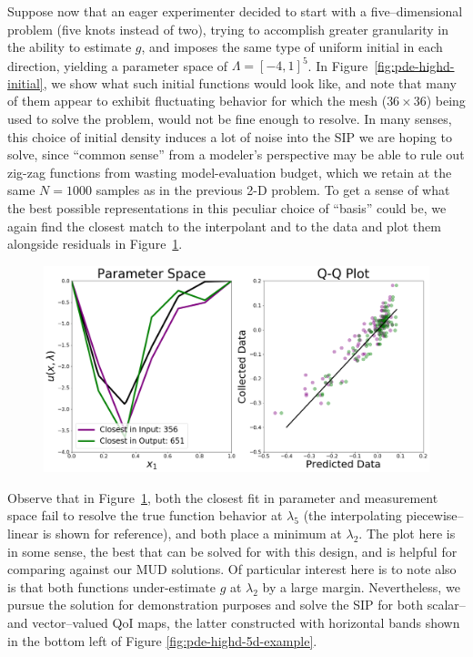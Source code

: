 Suppose now that an eager experimenter decided to start with a five--dimensional problem (five knots instead of two), trying to accomplish greater granularity in the ability to estimate $g$, and imposes the same type of uniform initial in each direction, yielding a parameter space of $\Lambda = [-4, 1]^5$.
In Figure~\ref{fig:pde-highd-initial}, we show what such initial functions would look like, and note that many of them appear to exhibit fluctuating behavior for which the mesh ($36\times36$) being used to solve the problem, would not be fine enough to resolve.
In many senses, this choice of initial density induces a lot of noise into the SIP we are hoping to solve, since ``common sense'' from a modeler's perspective may be able to rule out zig-zag functions from wasting model-evaluation budget, which we retain at the same $N=1000$ samples as in the previous 2-D problem.
To get a sense of what the best possible representations in this peculiar choice of ``basis'' could be, we again find the closest match to the interpolant and to the data and plot them alongside residuals in Figure~\ref{fig:pde-5d-proj}.

\begin{figure}[htbp]
\centering
  \includegraphics[width=0.675\linewidth]{figures/pde-highd/pde-highd_proj_D5}
\caption{
}
\label{fig:pde-5d-proj}
\end{figure}

Observe that in Figure~\ref{fig:pde-5d-proj}, both the closest fit in parameter and measurement space fail to resolve the true function behavior at $\lambda_5$ (the interpolating piecewise--linear is shown for reference), and both place a minimum at $\lambda_2$.
The plot here is in some sense, the best that can be solved for with this design, and is helpful for comparing against our MUD solutions.
Of particular interest here is to note also is that both functions under-estimate $g$ at $\lambda_2$ by a large margin.
Nevertheless, we pursue the solution for demonstration purposes and solve the SIP for both scalar-- and vector--valued QoI maps, the latter constructed with horizontal bands shown in the bottom left of Figure \ref{fig:pde-highd-5d-example}.

